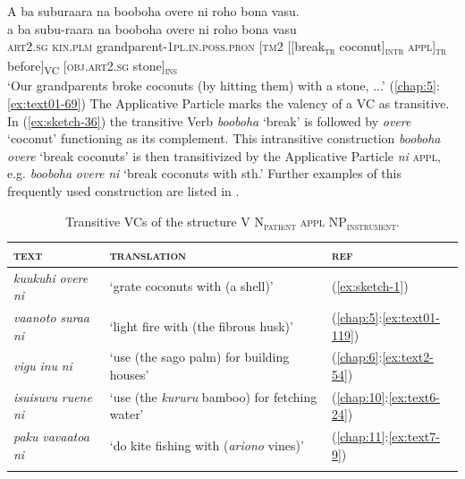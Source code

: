 \documentclass[output=paper]{langscibook}
\begin{document}
\ea\label{ex:sketch-36}
A ba suburaara na booboha overe ni roho bona vasu.\\
\gll a	ba	subu-raara	na	booboha	overe	ni	roho	bona	vasu\\
     \textsc{art}2.\textsc{sg}	\textsc{kin}.\textsc{plm}	grandparent-1\textsc{pl}.\textsc{in}.\textsc{poss}.\textsc{pron}	[\textsc{tm}2	[[break\textsubscript{\textsc{tr}}	coconut]\textsubscript{\textsc{intr}}	\textsc{appl}]\textsubscript{\textsc{tr}}	before]\textsubscript{VC}	[\textsc{obj}.\textsc{art}2.\textsc{sg}	stone]\textsubscript{\textsc{ins}}\\
    \glt `Our grandparents broke coconuts (by hitting them) with a stone, ...' (\ref{chap:5}:\ref{ex:text01-69})
\z
The Applicative Particle marks the valency of a VC as transitive. In (\ref{ex:sketch-36}) the transitive Verb \textit{booboha} `break' is followed by \textit{overe} `coconut' functioning as its complement. This intransitive construction \textit{booboha} \textit{overe} `break coconuts' is then transitivized by the Applicative Particle \textit{ni} \textsc{appl}, e.g. \textit{booboha} \textit{overe} \textit{ni} `break coconuts with sth.' Further examples of this frequently used construction are listed in .

\begin{table}
    \caption{Transitive VCs of the structure V N\textsubscript{\textsc{patient}} \textsc{appl} NP\textsubscript{\textsc{instrument}}.} \label{tab:transitivized}
\begin{tabularx}{\textwidth}{Xll}
    \lsptoprule
    \textsc{text}&\textsc{translation}&\textsc{ref}\\
    \midrule
        \textit{kuukuhi} \textit{overe} \textit{ni}&`grate coconuts with (a shell)'&(\ref{ex:sketch-1})\\
        \textit{vaanoto} \textit{suraa} \textit{ni}&`light fire with (the fibrous husk)'&(\ref{chap:5}:\ref{ex:text01-119})\\
        \textit{vigu} \textit{inu} \textit{ni}&`use (the sago palm) for building houses'&(\ref{chap:6}:\ref{ex:text2-54})\\
        \textit{isuisuvu} \textit{ruene} \textit{ni}&`use (the \textit{kururu} bamboo) for fetching water'&(\ref{chap:10}:\ref{ex:text6-24})\\
        \textit{paku} \textit{vavaatoa} \textit{ni}&`do kite fishing with (\textit{ariono} vines)'&(\ref{chap:11}:\ref{ex:text7-9})\\
    \lspbottomrule
\end{tabularx}
\end{table}
\end{document}
